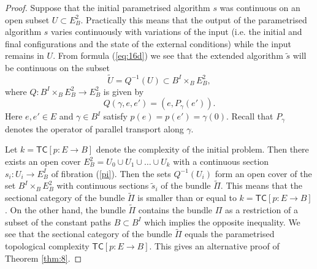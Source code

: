 \documentclass[10pt,a4paper]{amsart}
\def\tc{{\mathsf{TC}}}
\begin{document}
\begin{proof}
Suppose that the initial parametrised algorithm $s$ was continuous on an open subset 
$U\subset E^2_B$. Practically this means that the output of the parametrised algorithm $s$ varies continuously with variations of the input 
(i.e. the initial and final configurations and the state of the external conditions) while the input remains in $U$. 
From formula (\ref{eq:16d}) we see that the extended algorithm $\tilde s$ will be continuous on the subset 
$$
\tilde U= Q^{-1}(U)\subset B^I\times_B E^2_B,
$$
where $Q: B^I\times_B E^2_B\to E^2_B$ is given by 
$$Q(\gamma, e, e')=(e, P_\gamma(e')).$$
Here $e, e'\in E$ and $\gamma\in B^I$ satisfy $p(e)=p(e')=\gamma(0)$. Recall that $P_\gamma$ denotes the operator of parallel transport along $\gamma$. 

Let $k=\tc[p:E\to B]$ denote the complexity of the initial problem. Then there exists an open cover 
$E^2_B =U_0\cup U_1\cup\dots \cup U_k$ with a continuous section $s_i:U_i\to E^I_B$ of fibration (\ref{pi}). 
Then the sets $Q^{-1}(U_i)$ form an open cover of the set 
$B^I\times_B E^2_B$ with continuous sections $\tilde s_i$ of the bundle $\tilde \Pi$. This means that the sectional category of the bundle 
$\tilde \Pi$ is smaller than or equal to $k=\tc[p:E\to B]$. On the other hand, the bundle $\tilde \Pi$ contains the bundle $\Pi$ as a restriction of a subset of the constant paths $B\subset B^I$ which implies the opposite inequality. 
We see that the sectional category of the bundle $\tilde \Pi$ equals 
the parametrised topological complexity $\tc[p:E\to B]$. This gives an alternative proof of Theorem \ref{thm:8}. 
\end{proof}
\end{document}
